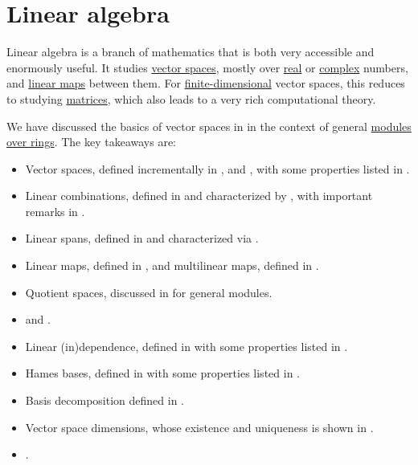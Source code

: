 \section{Linear algebra}\label{sec:linear_algebra}

Linear algebra is a branch of mathematics that is both very accessible and enormously useful. It studies \hyperref[def:vector_space]{vector spaces}, mostly over \hyperref[def:real_numbers]{real} or \hyperref[def:complex_numbers]{complex} numbers, and \hyperref[def:semimodule/homomorphism]{linear maps} between them. For \hyperref[thm:vector_space_dimension]{finite-dimensional} vector spaces, this reduces to studying \hyperref[def:array/matrix]{matrices}, which also leads to a very rich computational theory.

We have discussed the basics of vector spaces in  in the context of general \hyperref[def:module]{modules over rings}. The key takeaways are:
\begin{itemize}
  \item Vector spaces, defined incrementally in ,  and , with some properties listed in .
  \item Linear combinations, defined in  and characterized by , with important remarks in .
  \item Linear spans, defined in  and characterized via .
  \item Linear maps, defined in , and multilinear maps, defined in .
  \item Quotient spaces, discussed in  for general modules.
  \item {} and .
  \item Linear (in)dependence, defined in  with some properties listed in .
  \item Hames bases, defined in  with some properties listed in .
  \item Basis decomposition defined in .
  \item Vector space dimensions, whose existence and uniqueness is shown in .
  \item {}.
\end{itemize}
